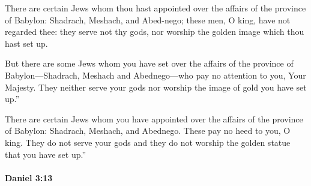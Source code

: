 			\begin{versebox}
					\item[BHS] 
					\item[LXX] 
					\item[ASV] There are certain Jews whom thou hast appointed over the affairs of the province of Babylon: Shadrach, Meshach, and Abed-nego; these men, O king, have not regarded thee: they serve not thy gods, nor worship the golden image which thou hast set up.
					\item[NIV] But there are some Jews whom you have set over the affairs of the province of Babylon—Shadrach, Meshach and Abednego—who pay no attention to you, Your Majesty. They neither serve your gods nor worship the image of gold you have set up.”
					\item[NRSV] There are certain Jews whom you have appointed over the affairs of the province of Babylon: Shadrach, Meshach, and Abednego. These pay no heed to you, O king. They do not serve your gods and they do not worship the golden statue that you have set up.”
			\end{versebox}

		\paragraph{Daniel 3:13} %
			\label{DANIEL-3-13}

